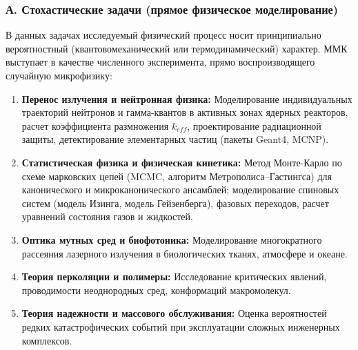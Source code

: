 \documentclass[11pt,a4paper]{article}
\begin{document}
\subsubsection{А. Стохастические задачи (прямое физическое моделирование)}
В данных задачах исследуемый физический процесс носит принципиально вероятностный (квантовомеханический или термодинамический) характер. ММК выступает в качестве численного эксперимента, прямо воспроизводящего случайную микрофизику:
\begin{enumerate}
    \item \textbf{Перенос излучения и нейтронная физика:} Моделирование индивидуальных траекторий нейтронов и гамма-квантов в активных зонах ядерных реакторов, расчет коэффициента размножения $k_{eff}$, проектирование радиационной защиты, детектирование элементарных частиц (пакеты Geant4, MCNP).
    \item \textbf{Статистическая физика и физическая кинетика:} Метод Монте-Карло по схеме марковских цепей (MCMC, алгоритм Метрополиса--Гастингса) для канонического и микроканонического ансамблей; моделирование спиновых систем (модель Изинга, модель Гейзенберга), фазовых переходов, расчет уравнений состояния газов и жидкостей.
    \item \textbf{Оптика мутных сред и биофотоника:} Моделирование многократного рассеяния лазерного излучения в биологических тканях, атмосфере и океане.
    \item \textbf{Теория перколяции и полимеры:} Исследование критических явлений, проводимости неоднородных сред, конформаций макромолекул.
    \item \textbf{Теория надежности и массового обслуживания:} Оценка вероятностей редких катастрофических событий при эксплуатации сложных инженерных комплексов.
\end{enumerate}
\end{document}
